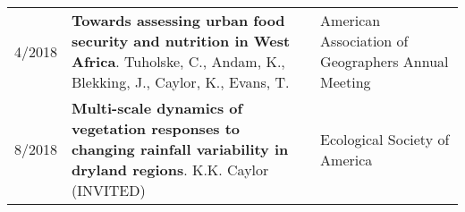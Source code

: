 \begin{longtable}{lp{10.0cm}p{4.5cm}}
 4/2018 & {\bf Towards assessing urban food security and nutrition in West Africa}. Tuholske, C., Andam, K., Blekking, J., Caylor, K., Evans, T.  & American Association of Geographers Annual Meeting \\
 8/2018 & {\bf Multi-scale dynamics of vegetation responses to changing rainfall variability in dryland regions}. K.K. Caylor (INVITED) & Ecological Society of America\\
\end{longtable}

